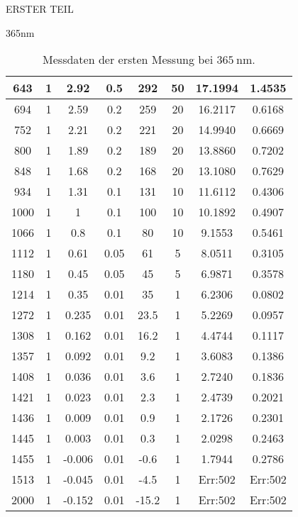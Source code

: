 \begin{appendix}
\begin{chapter}{ERSTER TEIL}
\begin{section}{365nm}
\begin{table}[htbp]
\begin{tabular}{|c|c|c|c|c|c|c|c|}
            643 & 1 & 2.92 & 0.5 & 292 & 50 & 17.1994 & 1.4535 \\ \hline
            694 & 1 & 2.59 & 0.2 & 259 & 20 & 16.2117 & 0.6168 \\ \hline
            752 & 1 & 2.21 & 0.2 & 221 & 20 & 14.9940 & 0.6669 \\ \hline
            800 & 1 & 1.89 & 0.2 & 189 & 20 & 13.8860 & 0.7202 \\ \hline
            848 & 1 & 1.68 & 0.2 & 168 & 20 & 13.1080 & 0.7629 \\ \hline
            934 & 1 & 1.31 & 0.1 & 131 & 10 & 11.6112 & 0.4306 \\ \hline
            1000 & 1 & 1 & 0.1 & 100 & 10 & 10.1892 & 0.4907 \\ \hline
            1066 & 1 & 0.8 & 0.1 & 80 & 10 & 9.1553 & 0.5461 \\ \hline
            1112 & 1 & 0.61 & 0.05 & 61 & 5 & 8.0511 & 0.3105 \\ \hline
            1180 & 1 & 0.45 & 0.05 & 45 & 5 & 6.9871 & 0.3578 \\ \hline
            1214 & 1 & 0.35 & 0.01 & 35 & 1 & 6.2306 & 0.0802 \\ \hline
            1272 & 1 & 0.235 & 0.01 & 23.5 & 1 & 5.2269 & 0.0957 \\ \hline
            1308 & 1 & 0.162 & 0.01 & 16.2 & 1 & 4.4744 & 0.1117 \\ \hline
            1357 & 1 & 0.092 & 0.01 & 9.2 & 1 & 3.6083 & 0.1386 \\ \hline
            1408 & 1 & 0.036 & 0.01 & 3.6 & 1 & 2.7240 & 0.1836 \\ \hline
            1421 & 1 & 0.023 & 0.01 & 2.3 & 1 & 2.4739 & 0.2021 \\ \hline
            1436 & 1 & 0.009 & 0.01 & 0.9 & 1 & 2.1726 & 0.2301 \\ \hline
            1445 & 1 & 0.003 & 0.01 & 0.3 & 1 & 2.0298 & 0.2463 \\ \hline
            1455 & 1 & -0.006 & 0.01 & -0.6 & 1 & 1.7944 & 0.2786 \\ \hline
            1513 & 1 & -0.045 & 0.01 & -4.5 & 1 & Err:502 & Err:502 \\ \hline
            2000 & 1 & -0.152 & 0.01 & -15.2 & 1 & Err:502 & Err:502 \\ \hline
          \end{tabular}
          \caption{Messdaten der ersten Messung bei $\SI{365}{\nano\meter}$.}
          \label{tab:365_1}
        \end{table}
        

\end{section}
\end{chapter}
\end{appendix}
